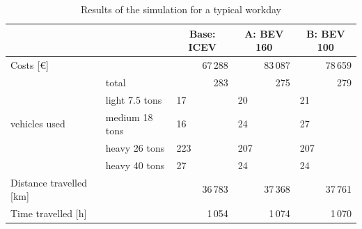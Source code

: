 \begin{table}[tb]
	\caption{Results of the simulation for a typical workday}
	\begin{tabular*}{\hsize}{@{\extracolsep{\fill}}llrrrrrr@{}}
		&  & \multicolumn{2}{c}{Base: ICEV} & \multicolumn{2}{c}{A: BEV 160} & \multicolumn{2}{c}{B: BEV 100} \\
		\midrule
		Costs [\euro] & & \multicolumn{2}{r}{67\,288} & \multicolumn{2}{r}{83\,087} & \multicolumn{2}{r}{78\,659} \\
		\hline
		\multirow{ 5}{50pt}{vehicles used}  & total & \multicolumn{2}{r}{283} & \multicolumn{2}{r}{275} & \multicolumn{2}{r}{279}\\
		& light 7.5 tons & \multicolumn{2}{l}{17} & \multicolumn{2}{l}{20} & \multicolumn{2}{l}{21}\\
		& medium 18 tons &  \multicolumn{2}{l}{16} & \multicolumn{2}{l}{24} & \multicolumn{2}{l}{27}\\ 
		& heavy 26 tons &  \multicolumn{2}{l}{223} & \multicolumn{2}{l}{207} & \multicolumn{2}{l}{207}\\
		& heavy 40 tons &  \multicolumn{2}{l}{27} & \multicolumn{2}{l}{24} & \multicolumn{2}{l}{24}\\ \hline
		
		Distance travelled [km] & & \multicolumn{2}{r}{36\,783} & \multicolumn{2}{r}{37\,368}  & \multicolumn{2}{r}{37\,761}\\
		Time travelled [h] & & \multicolumn{2}{r}{1\,054} & \multicolumn{2}{r}{1\,074}  & \multicolumn{2}{r}{1\,070}\\
		
	\end{tabular*}
	\label{tab:results}
\end{table}

